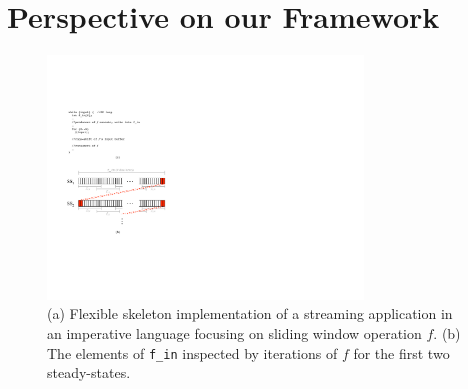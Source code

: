 
\section{Perspective on our Framework}

\begin{figure}[t]
\centering
\includegraphics[width=3.3in]{figures/early-example.pdf}
\caption{(a) Flexible skeleton implementation of a streaming
  application in an imperative language focusing on sliding window
  operation $f$. (b) The elements of {\tt f\_in} inspected by
  iterations of $f$ for the first two steady-states.
\label{fig:comparison}}
\vspace{-10pt}
\end{figure}

